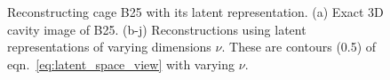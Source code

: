 \documentclass[journal=jacsat,manuscript=article,layout=traditional]{achemso}
\begin{document}
\begin{figure}
	\qquad
	\caption{Reconstructing cage B25 with its latent representation. (a) Exact 3D cavity image of B25. (b-j) Reconstructions using latent representations of varying dimensions $\nu$. These are contours (0.5) of eqn.~\ref{eq:latent_space_view} with varying $\nu$.
	} \label{fig:cage_reconstruction}
\end{figure}
\end{document}
